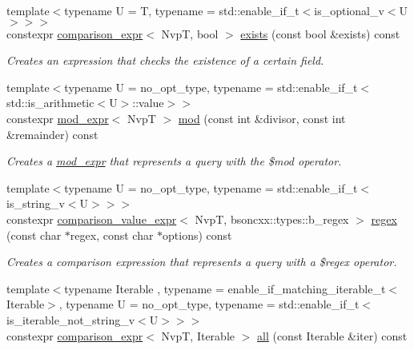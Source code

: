 \begin{DoxyCompactItemize}
{\footnotesize template$<$typename U  = T, typename  = std\+::enable\+\_\+if\+\_\+t$<$is\+\_\+optional\+\_\+v$<$\+U$>$$>$$>$ }\\constexpr \hyperlink{classmongo__odm_1_1comparison__expr}{comparison\+\_\+expr}$<$ NvpT, bool $>$ \hyperlink{classmongo__odm_1_1nvp__base_ab323224f300d9fb9681d975f2ce98544}{exists} (const bool \&exists) const 
\begin{DoxyCompactList}\small\item\em Creates an expression that checks the existence of a certain field. \end{DoxyCompactList}\item 
{\footnotesize template$<$typename U  = no\+\_\+opt\+\_\+type, typename  = std\+::enable\+\_\+if\+\_\+t$<$std\+::is\+\_\+arithmetic$<$\+U$>$\+::value$>$$>$ }\\constexpr \hyperlink{classmongo__odm_1_1mod__expr}{mod\+\_\+expr}$<$ NvpT $>$ \hyperlink{classmongo__odm_1_1nvp__base_ab87edbd61b20c1fe0dcbd834d41d58cb}{mod} (const int \&divisor, const int \&remainder) const 
\begin{DoxyCompactList}\small\item\em Creates a \hyperlink{classmongo__odm_1_1mod__expr}{mod\+\_\+expr} that represents a query with the \$mod operator. \end{DoxyCompactList}\item 
{\footnotesize template$<$typename U  = no\+\_\+opt\+\_\+type, typename  = std\+::enable\+\_\+if\+\_\+t$<$is\+\_\+string\+\_\+v$<$\+U$>$$>$$>$ }\\constexpr \hyperlink{classmongo__odm_1_1comparison__value__expr}{comparison\+\_\+value\+\_\+expr}$<$ NvpT, bsoncxx\+::types\+::b\+\_\+regex $>$ \hyperlink{classmongo__odm_1_1nvp__base_a4437128b0fafda2f178172197a539499}{regex} (const char $\ast$regex, const char $\ast$options) const 
\begin{DoxyCompactList}\small\item\em Creates a comparison expression that represents a query with a \$regex operator. \end{DoxyCompactList}\item 
{\footnotesize template$<$typename Iterable , typename  = enable\+\_\+if\+\_\+matching\+\_\+iterable\+\_\+t$<$\+Iterable$>$, typename U  = no\+\_\+opt\+\_\+type, typename  = std\+::enable\+\_\+if\+\_\+t$<$is\+\_\+iterable\+\_\+not\+\_\+string\+\_\+v$<$\+U$>$$>$$>$ }\\constexpr \hyperlink{classmongo__odm_1_1comparison__expr}{comparison\+\_\+expr}$<$ NvpT, Iterable $>$ \hyperlink{classmongo__odm_1_1nvp__base_a5e45eef873ecf7fe668ed35f85f5962c}{all} (const Iterable \&iter) const 

\end{DoxyCompactItemize}
